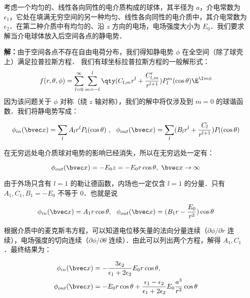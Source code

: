 \begin{example}{}
考虑一个均匀的、线性各向同性的电介质构成的球体，其半径为 $a$，介电常数为 $\epsilon_1$，它处在填满无穷空间的另一种均匀、线性各向同性的电介质中，其介电常数为 $\epsilon_2$．在第二种介质中有均匀的、沿 $z$ 方向的电场，电场强度大小为 $E_0$．我们要求解当介电球体放入后空间各点的静电势．

\textbf{解：}由于空间各点不存在自由电荷分布，我们得知静电势 $\phi$ 在全空间（除了球壳上）满足拉普拉斯方程．
我们有球坐标拉普拉斯方程的一般解形式：
\begin{equation}\label{EPoiEQ_eq2}
f(r, \theta, \phi) = \sum_{l = 0}^\infty \sum_{m = -l}^l \qty(C_{l,m} r^l + \frac{C'_{l,m}}{r^{l+1}})P_l^m(\cos\theta)\E^{\I m\phi}
\end{equation}
因为该问题关于 $\phi$ 对称（绕 $z$ 轴对称），我们的解中将仅涉及到 $m=0$ 的球谐函数．我们将静电势写成：

\begin{equation}
\phi_{in}(\bvec x)=\sum_{l}A_lr^lP_l(\cos \theta)\ ,\ \ \phi_{out}(\bvec x)=\sum_{l}(B_lr^l+\frac{C_l}{r^{l+1}})P_l(\cos \theta)
\end{equation}

在无穷远处电介质球对电势的影响已经消失，所以在无穷远处一定有：

\begin{equation}
\phi_{out}(\bvec x)=-E_0z=-E_0r\cos\theta,\ \bvec x\rightarrow \infty
\end{equation}

由于外场只含有 $l=1$ 的勒让德函数，内场也一定仅含 $l=1$ 的分量．只有 $A_1,C_1,B_1=-E_0$ 不等于 $0$．也就是说

\begin{equation}
\phi_{in}(\bvec x)=A_1r\cos \theta,\ \
\phi_{out}(\bvec x)=(B_1r-\frac{E_0}{r^{2}})\cos\theta
\end{equation}

根据介质中的麦克斯韦方程，可以知道电位移矢量的法向分量连续（$\partial\phi/\partial r$ 连续），电场强度的切向连续（$\partial\phi/\partial \theta$ 连续）．由此可以列出两个方程，解得 $A_1,C_1$．最终结果为：

\begin{align}
\phi_{in}(\bvec x)&=-\frac{3\epsilon_2}{\epsilon_1+2\epsilon_2}E_0r\cos\theta,\\
\phi_{out}(\bvec x)&=-E_0r\cos\theta+\frac{\epsilon_1-\epsilon_2}{\epsilon_1+2\epsilon_2}E_0\frac{a^3}{r^2}\cos\theta
\end{align}
\end{example}
